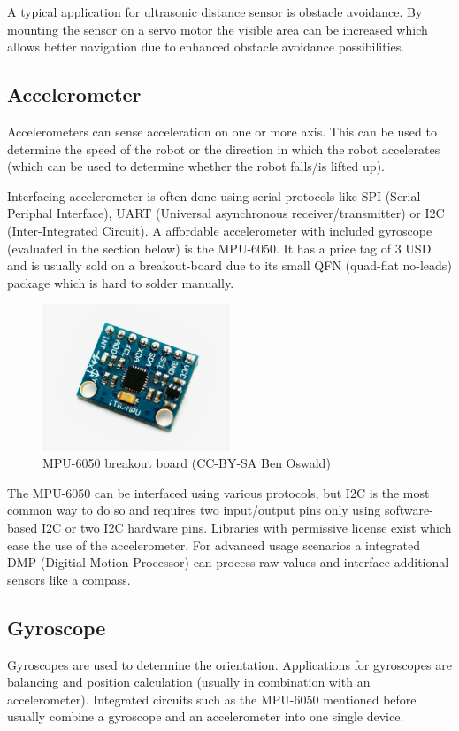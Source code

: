 A typical application for ultrasonic distance sensor is obstacle avoidance. By mounting the sensor on a servo motor the visible area can be increased which allows better navigation due to enhanced obstacle avoidance possibilities. 

\subsection{Accelerometer}
Accelerometers can sense acceleration on one or more axis. This can be used to determine the speed of the robot or the direction in which the robot accelerates (which can be used to determine whether the robot falls/is lifted up). 

Interfacing accelerometer is often done using serial protocols like SPI (Serial Periphal Interface), UART (Universal asynchronous receiver/transmitter) or I2C (Inter-Integrated Circuit). A affordable accelerometer with included gyroscope (evaluated in the section below) is the MPU-6050. It has a price tag of 3 USD and is usually sold on a breakout-board due to its small QFN (quad-flat no-leads) package which is hard to solder manually. 

\begin{figure}[H]
  \centering
  \includegraphics[width=0.5\textwidth]{images/30_gyroaccel.jpg}
  \caption{MPU-6050 breakout board (CC-BY-SA Ben Oswald)}
\end{figure}

The MPU-6050 can be interfaced using various protocols, but I2C is the most common way to do so and requires two input/output pins only using software-based I2C or two I2C hardware pins. Libraries with permissive license exist which ease the use of the accelerometer. For advanced usage scenarios a integrated DMP (Digitial Motion Processor) can process raw values and interface additional sensors like a compass.
\subsection{Gyroscope}
Gyroscopes are used to determine the orientation. Applications for gyroscopes are balancing and position calculation (usually in combination with an accelerometer). Integrated circuits such as the MPU-6050 mentioned before usually combine a gyroscope and an accelerometer into one single device.


